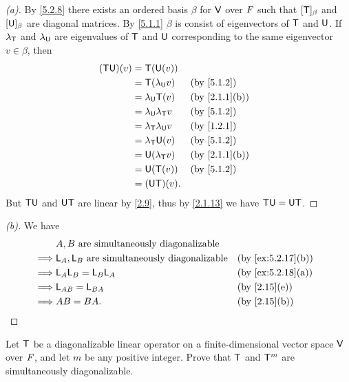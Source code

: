 \begin{proof}[(a)]
	By \cref{5.2.8} there exists an ordered basis \(\beta\) for \(\mathsf{V}\) over \(\mathit{F}\) such that \([\mathsf{T}]_{\beta}\) and \([\mathsf{U}]_{\beta}\) are diagonal matrices.
	By \cref{5.1.1} \(\beta\) is consist of eigenvectors of \(\mathsf{T}\) and \(\mathsf{U}\).
	If \(\lambda_{\mathsf{T}}\) and \(\lambda_{\mathsf{U}}\) are eigenvalues of \(\mathsf{T}\) and \(\mathsf{U}\) corresponding to the same eigenvector \(v \in \beta\), then
	\begin{align*}
		(\T \U)(v) & = \T(\U(v))                                      \\
		           & = \T(\lambda_{\U} v)          &  & \by{5.1.2}    \\
		           & = \lambda_{\U} \T(v)          &  & \by{2.1.1}[b] \\
		           & = \lambda_{\U} \lambda_{\T} v &  & \by{5.1.2}    \\
		           & = \lambda_{\T} \lambda_{\U} v &  & \by{1.2.1}    \\
		           & = \lambda_{\T} \U(v)          &  & \by{5.1.2}    \\
		           & = \U(\lambda_{\T} v)          &  & \by{2.1.1}[b] \\
		           & = \U(\T(v))                   &  & \by{5.1.2}    \\
		           & = (\U \T)(v).
	\end{align*}
	But \(\mathsf{T} \mathsf{U}\) and \(\mathsf{U} \mathsf{T}\) are linear by \cref{2.9}, thus by \cref{2.1.13} we have \(\mathsf{T} \mathsf{U} = \mathsf{U} \mathsf{T}\).
\end{proof}

\begin{proof}[(b)]
	We have
	\begin{align*}
		         & A, B \text{ are simultaneously diagonalizable}                              \\
		\implies & \L_A, \L_B \text{ are simultaneously diagonalizable} &  & \by{ex:5.2.17}[b] \\
		\implies & \L_A \L_B = \L_B \L_A                                &  & \by{ex:5.2.18}[a] \\
		\implies & \L_{AB} = \L_{BA}                                    &  & \by{2.15}[e]      \\
		\implies & AB = BA.                                             &  & \by{2.15}[b]
	\end{align*}
\end{proof}

\begin{ex}\label{ex:5.2.19}
	Let \(\mathsf{T}\) be a diagonalizable linear operator on a finite-dimensional vector space \(\mathsf{V}\) over \(\mathit{F}\), and let \(m\) be any positive integer.
	Prove that \(\mathsf{T}\) and \(\mathsf{T}^m\) are simultaneously diagonalizable.
\end{ex}

